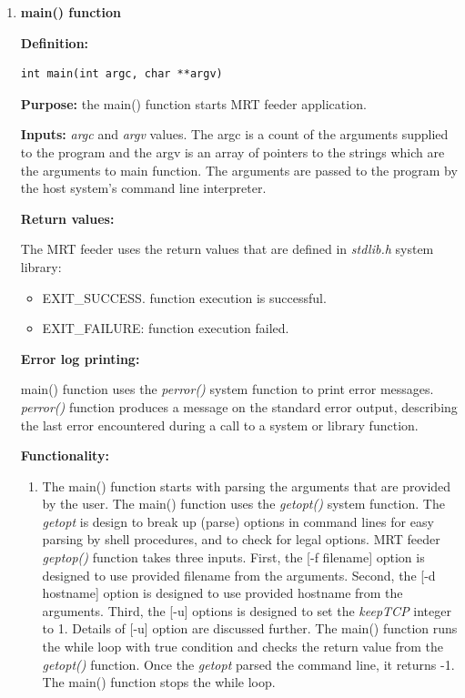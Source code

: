 \begin{enumerate}

\item{\textbf{main() function} }

\textbf{Definition:}  
\begin{verbatim}
int main(int argc, char **argv)
\end{verbatim}

\textbf{Purpose:} the main() function starts MRT feeder application. 

\textbf{Inputs:} \emph{argc} and \emph{argv} values. The argc is a count of the arguments supplied to the program and the argv is an array of pointers to the strings which are the arguments to main function. The arguments are passed to the program by the host system's command line interpreter. 

\textbf{Return values:}

The MRT feeder  uses the return values that are defined in \emph{stdlib.h} system library:
\begin{itemize}
\item{EXIT\_SUCCESS. function execution is  successful. }
\item{EXIT\_FAILURE: function execution failed.}
\end{itemize} 

\textbf{Error log printing:}

main() function uses the \emph{perror()} system function to print error messages. \emph{perror()} function produces a message on the standard error output, describing the last error encountered during a call to a system or library function.

\textbf{Functionality:}

\begin{enumerate}
  \item{The main() function starts with parsing the arguments that are provided by the user. The  main() function uses the \emph{getopt()} system function. The \emph{getopt} is design to  break  up  (parse)  options  in command lines for easy parsing by shell procedures, and to check for legal    options.  MRT feeder \emph{geptop()} function takes three inputs. First, the [-f filename] option is designed to use provided filename from the arguments.  Second, the [-d hostname] option is designed to use provided hostname from the arguments.  Third, the [-u] options is designed to set the \emph{keepTCP} integer to 1. Details of [-u] option are discussed further.  The main() function runs the while loop with true condition and checks the return value from the \emph{getopt()} function. Once the \emph{getopt} parsed the command line, it returns -1. The  main() function stops the while loop.}
  

\end{enumerate}
\end{enumerate}
